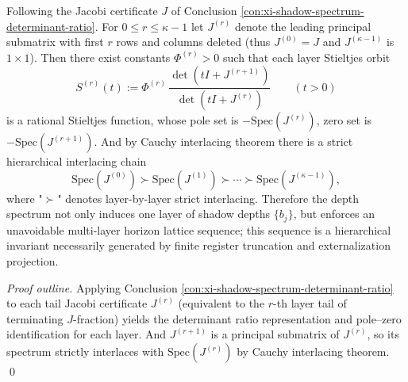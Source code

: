 \begin{proposition}\label{prop:xi-shadow-spectrum-tower-principal-minors}
Following the Jacobi certificate \(J\) of Conclusion \ref{con:xi-shadow-spectrum-determinant-ratio}.
For \(0\le r\le \kappa-1\) let \(J^{(r)}\) denote the leading principal submatrix with first \(r\) rows and columns deleted (thus \(J^{(0)}=J\) and \(J^{(\kappa-1)}\) is \(1\times 1\)).
Then there exist constants \(\Phi^{(r)}>0\) such that each layer Stieltjes orbit
\[
S^{(r)}(t):=\Phi^{(r)}\,\frac{\det(tI+J^{(r+1)})}{\det(tI+J^{(r)})}\qquad (t>0)
\]
is a rational Stieltjes function, whose pole set is \(-\mathrm{Spec}(J^{(r)})\), zero set is \(-\mathrm{Spec}(J^{(r+1)})\).
And by Cauchy interlacing theorem there is a strict hierarchical interlacing chain
\[
\boxed{\;
\mathrm{Spec}(J^{(0)}) \succ \mathrm{Spec}(J^{(1)}) \succ \cdots \succ \mathrm{Spec}(J^{(\kappa-1)}),\;}
\]
where "\(\succ\)" denotes layer-by-layer strict interlacing.
Therefore the depth spectrum not only induces one layer of shadow depths \(\{b_j\}\), but enforces an unavoidable multi-layer horizon lattice sequence; this sequence is a hierarchical invariant necessarily generated by finite register truncation and externalization projection.
\end{proposition}
\begin{proof}[Proof outline]
Applying Conclusion \ref{con:xi-shadow-spectrum-determinant-ratio} to each tail Jacobi certificate \(J^{(r)}\) (equivalent to the \(r\)-th layer tail of terminating \(J\)-fraction) yields the determinant ratio representation and pole--zero identification for each layer.
And \(J^{(r+1)}\) is a principal submatrix of \(J^{(r)}\), so its spectrum strictly interlaces with \(\mathrm{Spec}(J^{(r)})\) by Cauchy interlacing theorem. \qed
\end{proof}

